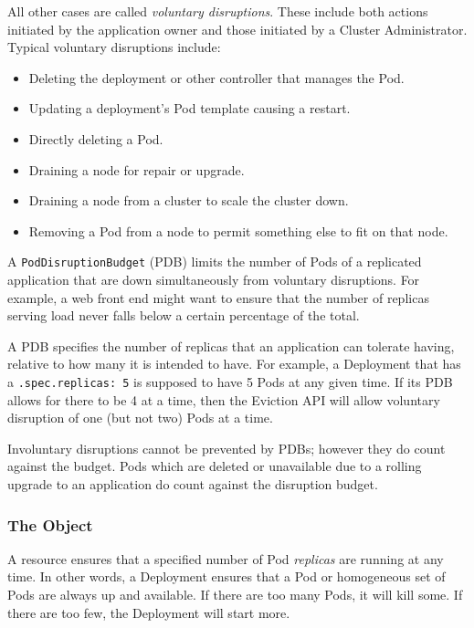 All other cases are called \emph{voluntary disruptions}. These include both
actions initiated by the application owner and those initiated by a Cluster
Administrator. Typical voluntary disruptions include:

\begin{itemize}
	\tightlist
	\item Deleting the deployment or other controller that manages the Pod.
	\item Updating a deployment's Pod template causing a restart.
	\item Directly deleting a Pod.
	\item Draining a node for repair or upgrade.
	\item Draining a node from a cluster to scale the cluster down.
	\item Removing a Pod from a node to permit something else to fit on that
	      node.
\end{itemize}

A \texttt{PodDisruptionBudget} (PDB) limits the number of Pods of a replicated
application that are down simultaneously from voluntary disruptions. For
example, a web front end might want to ensure that the number of replicas
serving load never falls below a certain percentage of the total.

A PDB specifies the number of replicas that an application can tolerate having,
relative to how many it is intended to have. For example, a Deployment that has
a \texttt{.spec.replicas:\ 5} is supposed to have 5 Pods at any given time. If
its PDB allows for there to be 4 at a time, then the Eviction API will allow
voluntary disruption of one (but not two) Pods at a time.

Involuntary disruptions cannot be prevented by PDBs; however they do count
against the budget. Pods which are deleted or unavailable due to a rolling
upgrade to an application do count against the disruption budget.

\subsubsection{The  Object}
\label{section:deployment}
A  resource ensures that a specified number of Pod
\textit{replicas} are running at any time. In other words, a Deployment ensures
that a Pod or homogeneous set of Pods are always up and available. If there are
too many Pods, it will kill some. If there are too few, the Deployment will
start more.

